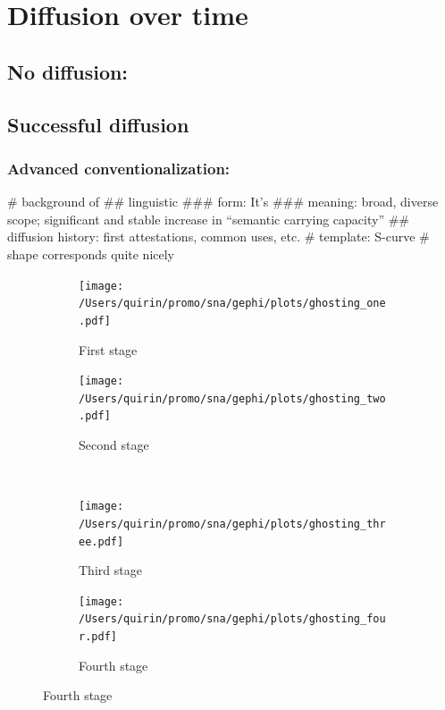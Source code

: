 \documentclass[
  a4paper,
  ]{scrartcl}
\begin{document}
\section{Diffusion over time}

  \subsection{No diffusion: }

  \subsection{Successful diffusion}

    \subsubsection{Advanced conventionalization: }

      \begin{easylist}[itemize]
        # background of 
          ## linguistic
            ### form: It's
            ### meaning: broad, diverse scope; significant and stable increase in \enquote{semantic carrying capacity}
          ## diffusion history: first attestations, common uses, etc.
        # template: S-curve
          # shape corresponds quite nicely
      \end{easylist}

      \begin{figure}[H]
        \caption{Social network of diffusion for  over time.}
        \centering
        \begin{subfigure}{.45\linewidth}
          \caption{First stage}
          \centering
          \texttt{[image: /Users/quirin/promo/sna/gephi/plots/ghosting\_one.pdf]}
        \end{subfigure}
        \begin{subfigure}{.45\linewidth}
          \caption{Second stage}
          \centering
          \texttt{[image: /Users/quirin/promo/sna/gephi/plots/ghosting\_two.pdf]}
        \end{subfigure}\\
        \begin{subfigure}{.45\linewidth}
          \caption{Third stage}
          \centering
          \texttt{[image: /Users/quirin/promo/sna/gephi/plots/ghosting\_three.pdf]}
        \end{subfigure}
        \begin{subfigure}{.45\linewidth}
          \caption{Fourth stage}
          \centering
          \texttt{[image: /Users/quirin/promo/sna/gephi/plots/ghosting\_four.pdf]}
        \end{subfigure}
      \end{figure}
\end{document}
